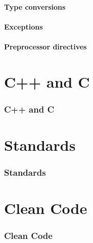 \documentclass{beamer}
\begin{document}
\subsection{Type conversions}
\begin{frame}

\end{frame}

\subsection{Exceptions}
\begin{frame}

\end{frame}

\subsection{Preprocessor directives}
\begin{frame}

\end{frame}


\part{C++ and C}
\section{C++ and C}
\begin{frame}

\end{frame}

\part{Standards}
\section{Standards}
\begin{frame}

\end{frame}


\part{Clean Code}
\section{Clean Code}
\begin{frame}

\end{frame}
\end{document}

